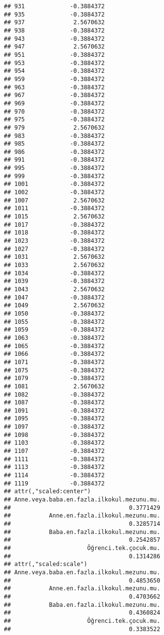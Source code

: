\documentclass[
]{article}
\begin{document}
\begin{verbatim}
## 931             -0.3884372
## 935             -0.3884372
## 937              2.5670632
## 938             -0.3884372
## 943             -0.3884372
## 947              2.5670632
## 951             -0.3884372
## 953             -0.3884372
## 954             -0.3884372
## 959             -0.3884372
## 963             -0.3884372
## 967             -0.3884372
## 969             -0.3884372
## 970             -0.3884372
## 975             -0.3884372
## 979              2.5670632
## 983             -0.3884372
## 985             -0.3884372
## 986             -0.3884372
## 991             -0.3884372
## 995             -0.3884372
## 999             -0.3884372
## 1001            -0.3884372
## 1002            -0.3884372
## 1007             2.5670632
## 1011            -0.3884372
## 1015             2.5670632
## 1017            -0.3884372
## 1018            -0.3884372
## 1023            -0.3884372
## 1027            -0.3884372
## 1031             2.5670632
## 1033             2.5670632
## 1034            -0.3884372
## 1039            -0.3884372
## 1043             2.5670632
## 1047            -0.3884372
## 1049             2.5670632
## 1050            -0.3884372
## 1055            -0.3884372
## 1059            -0.3884372
## 1063            -0.3884372
## 1065            -0.3884372
## 1066            -0.3884372
## 1071            -0.3884372
## 1075            -0.3884372
## 1079            -0.3884372
## 1081             2.5670632
## 1082            -0.3884372
## 1087            -0.3884372
## 1091            -0.3884372
## 1095            -0.3884372
## 1097            -0.3884372
## 1098            -0.3884372
## 1103            -0.3884372
## 1107            -0.3884372
## 1111            -0.3884372
## 1113            -0.3884372
## 1114            -0.3884372
## 1119            -0.3884372
## attr(,"scaled:center")
## Anne.veya.baba.en.fazla.ilkokul.mezunu.mu. 
##                                  0.3771429 
##           Anne.en.fazla.ilkokul.mezunu.mu. 
##                                  0.3285714 
##           Baba.en.fazla.ilkokul.mezunu.mu. 
##                                  0.2542857 
##                      Öğrenci.tek.çocuk.mu. 
##                                  0.1314286 
## attr(,"scaled:scale")
## Anne.veya.baba.en.fazla.ilkokul.mezunu.mu. 
##                                  0.4853650 
##           Anne.en.fazla.ilkokul.mezunu.mu. 
##                                  0.4703662 
##           Baba.en.fazla.ilkokul.mezunu.mu. 
##                                  0.4360824 
##                      Öğrenci.tek.çocuk.mu. 
##                                  0.3383522
\end{verbatim}
\end{document}
